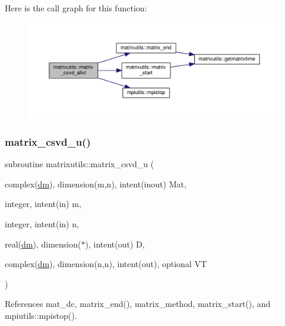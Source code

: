 Here is the call graph for this function\+:
\nopagebreak
\begin{figure}[H]
\begin{center}
\leavevmode
\includegraphics[width=350pt]{namespacematrixutils_aaca4350f2cff361fd0233962eba5fdc7_cgraph}
\end{center}
\end{figure}
\mbox{\label{namespacematrixutils_af38c4627b0e939eadba68b6ea264297b}} 
\subsubsection{\texorpdfstring{matrix\+\_\+csvd\+\_\+u()}{matrix\_csvd\_u()}}
{\footnotesize\ttfamily subroutine matrixutils\+::matrix\+\_\+csvd\+\_\+u (\begin{DoxyParamCaption}\item[{complex(\mbox{\hyperlink{namespacematrixutils_a7bdc564986ea4d90f51201c75606ef3d}{dm}}), dimension(m,n), intent(inout)}]{Mat,  }\item[{integer, intent(in)}]{m,  }\item[{integer, intent(in)}]{n,  }\item[{real(\mbox{\hyperlink{namespacematrixutils_a7bdc564986ea4d90f51201c75606ef3d}{dm}}), dimension($\ast$), intent(out)}]{D,  }\item[{complex(\mbox{\hyperlink{namespacematrixutils_a7bdc564986ea4d90f51201c75606ef3d}{dm}}), dimension(n,n), intent(out), optional}]{VT }\end{DoxyParamCaption})}



References mat\+\_\+dc, matrix\+\_\+end(), matrix\+\_\+method, matrix\+\_\+start(), and mpiutils\+::mpistop().


